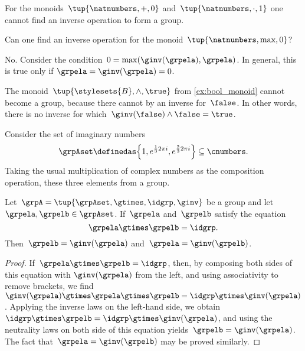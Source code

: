 \begin{example}
	For the monoids~$\tup{\natnumbers, +,0}$ and~$\tup{\natnumbers,\cdot ,1}$ one cannot find an inverse operation to form a group.
\end{example}

\begin{exercise}
	Can one find an inverse operation for the monoid~$\tup{\natnumbers,\max,0}$?
\end{exercise}
%
\begin{solution}
	No.
	Consider the condition~$0=\max(\ginv(\grpela),\grpela)$.
	In general, this is true only if $\grpela=\ginv(\grpela)=0$.
\end{solution}

\begin{example}
	The monoid~$\tup{\stylesets{B},\wedge, \true}$ from \cref{ex:bool_monoid} cannot become a group, because there cannot by an inverse for~$\false$.
	In other words, there is no inverse for which~$\ginv(\false)\wedge \false=\true$.
\end{example}
\begin{example}
	\label{grp-order-three}
	Consider the set of imaginary numbers
	\begin{equation*}
		\grpAset \definedas \Big\{ 1, e^{\frac{1}{3}2\pi i}, e^{\frac{2 }{3}2\pi i}  \Big\} \subseteq \cnumbers.
	\end{equation*}
	Taking the usual multiplication of complex numbers as the composition operation, these three elements from a group.
\end{example}


\begin{lemma}
	\label{lem:inv-op-unique}
	Let~$\grpA = \tup{ \grpAset, \gtimes, \idgrp, \ginv }$ be a group and let~$\grpela, \grpelb \in \grpAset$.
	If~$\grpela$ and~$\grpelb$ satisfy the equation
	\begin{equation}
		\grpela \gtimes \grpelb = \idgrp.
	\end{equation}
	Then~$\grpelb = \ginv( \grpela )$ and~$\grpela = \ginv(\grpelb)$.
\end{lemma}

\begin{proof}
	If~$\grpela \gtimes \grpelb = \idgrp$, then, by composing both sides of this equation with $\ginv(\grpela)$ from the left, and using associativity to remove brackets, we find~$\ginv(\grpela) \gtimes \grpela \gtimes \grpelb = \idgrp \gtimes \ginv(\grpela)$.
	Applying the inverse laws on the left-hand side, we obtain~$\idgrp \gtimes \grpelb = \idgrp \gtimes \ginv(\grpela)$, and using the neutrality laws on both side of this equation yields~$\grpelb =  \ginv(\grpela)$.
	The fact that~$\grpela = \ginv(\grpelb)$ may be proved similarly.
\end{proof}

